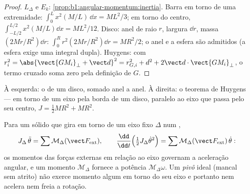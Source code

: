 \begin{proof}
$L_\Delta$ e $E_k$: \cref{prop:b1:angular-momentum:inertia}. Barra em torno de
uma extremidade: $\int_0^L x^2(M/L)\,\dd x = ML^2/3$; em torno do centro, $\int_{-L/2}^{L/2}
x^2(M/L)\dd x = ML^2/12$. Disco: anel de raio $r$, largura $\dd r$, massa
$(2Mr/R^2)\dd r$: $\int_0^R r^2(2Mr/R^2)\dd r = MR^2/2$; o anel e a
esfera são admitidos (a esfera exige uma integral dupla). Huygens: com
$r_i^2 = \abs{\vect{GM_i}_\perp + \vect d}^2 = r_{G,i}^2 + d^2 + 2\vect d\cdot
\vect{GM_i}_\perp$, o termo cruzado soma zero pela definição de $G$.
\end{proof}

\begin{omfigure}

{\small À esquerda: o  de um disco, somado anel a anel. À
direita: o teorema de Huygens --- em torno de um eixo pela borda de um disco,
paralelo ao eixo que passa pelo seu centro, $J = \tfrac12 MR^2 + MR^2$.}
\end{omfigure}

\begin{theorem}\label{thm:b1:systems-of-points:rotation}
Para um sólido que gira em torno de um eixo fixo $\Delta$ num ,
\[
J_\Delta\,\ddot\theta = \sum\mathcal M_\Delta(\vect F_{\mathrm{ext}}),
\qquad
\frac{\dd}{\dd t}\Big(\tfrac12 J_\Delta\dot\theta^2\Big) = \sum\mathcal M_\Delta(\vect F_{\mathrm{ext}})\,\dot\theta :
\]
os momentos das forças externas em relação ao eixo governam a aceleração
angular, e um momento $\mathcal M_\Delta$ fornece a potência
$\mathcal M_\Delta\omega$. Um \emph{pivô} ideal (mancal sem atrito) não exerce
momento algum em torno do seu eixo e portanto nem acelera nem freia a
rotação.
\end{theorem}

